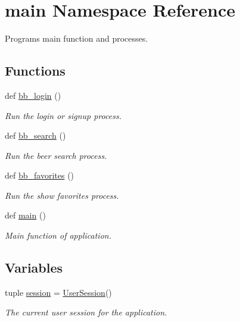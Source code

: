 \hypertarget{namespacemain}{}\section{main Namespace Reference}
\label{namespacemain}


Programs main function and processes.  


\subsection*{Functions}
\begin{DoxyCompactItemize}
\item 
def \hyperlink{namespacemain_a99f8d63f639b46856eb73f8cefa96491}{bb\+\_\+login} ()
\begin{DoxyCompactList}\small\item\em Run the login or signup process. \end{DoxyCompactList}\item 
def \hyperlink{namespacemain_a29413ffff2053a142a7fbecb1cd76f8d}{bb\+\_\+search} ()
\begin{DoxyCompactList}\small\item\em Run the beer search process. \end{DoxyCompactList}\item 
def \hyperlink{namespacemain_a930fb7adafdf123e6021492948c65fb4}{bb\+\_\+favorites} ()
\begin{DoxyCompactList}\small\item\em Run the show favorites process. \end{DoxyCompactList}\item 
def \hyperlink{namespacemain_af613cea4cba4fb7de8e40896b3368945}{main} ()
\begin{DoxyCompactList}\small\item\em Main function of application. \end{DoxyCompactList}\end{DoxyCompactItemize}
\subsection*{Variables}
\begin{DoxyCompactItemize}
\item 
tuple \hyperlink{namespacemain_a98baefdfc770c3f0d025c5a669572c93}{session} = \hyperlink{classdb__comms_1_1comms_1_1_user_session}{User\+Session}()
\begin{DoxyCompactList}\small\item\em The current user session for the application. \end{DoxyCompactList}\end{DoxyCompactItemize}


